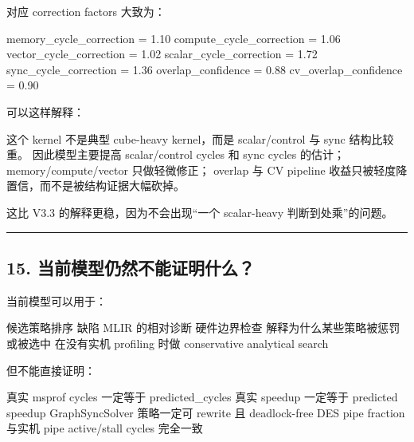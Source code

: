 \documentclass[
  10pt,
]{article}
\newenvironment{Shaded}{}{}
\newcommand{\NormalTok}[1]{#1}
\begin{document}
对应 correction factors 大致为：

\begin{Shaded}
\begin{Highlighting}[]
\NormalTok{memory\_cycle\_correction = 1.10}
\NormalTok{compute\_cycle\_correction = 1.06}
\NormalTok{vector\_cycle\_correction = 1.02}
\NormalTok{scalar\_cycle\_correction = 1.72}
\NormalTok{sync\_cycle\_correction = 1.36}
\NormalTok{overlap\_confidence = 0.88}
\NormalTok{cv\_overlap\_confidence = 0.90}
\end{Highlighting}
\end{Shaded}

可以这样解释：

\begin{Shaded}
\begin{Highlighting}[]
\NormalTok{这个 kernel 不是典型 cube{-}heavy kernel，而是 scalar/control 与 sync 结构比较重。}
\NormalTok{因此模型主要提高 scalar/control cycles 和 sync cycles 的估计；}
\NormalTok{memory/compute/vector 只做轻微修正；}
\NormalTok{overlap 与 CV pipeline 收益只被轻度降置信，而不是被结构证据大幅砍掉。}
\end{Highlighting}
\end{Shaded}

这比 V3.3 的解释更稳，因为不会出现``一个 scalar-heavy
判断到处乘''的问题。

\begin{center}\rule{0.5\linewidth}{0.5pt}\end{center}

\subsection{15.
当前模型仍然不能证明什么？}\label{ux5f53ux524dux6a21ux578bux4ecdux7136ux4e0dux80fdux8bc1ux660eux4ec0ux4e48}

当前模型可以用于：

\begin{Shaded}
\begin{Highlighting}[]
\NormalTok{候选策略排序}
\NormalTok{缺陷 MLIR 的相对诊断}
\NormalTok{硬件边界检查}
\NormalTok{解释为什么某些策略被惩罚或被选中}
\NormalTok{在没有实机 profiling 时做 conservative analytical search}
\end{Highlighting}
\end{Shaded}

但不能直接证明：

\begin{Shaded}
\begin{Highlighting}[]
\NormalTok{真实 msprof cycles 一定等于 predicted\_cycles}
\NormalTok{真实 speedup 一定等于 predicted speedup}
\NormalTok{GraphSyncSolver 策略一定可 rewrite 且 deadlock{-}free}
\NormalTok{DES pipe fraction 与实机 pipe active/stall cycles 完全一致}
\end{Highlighting}
\end{Shaded}
\end{document}
